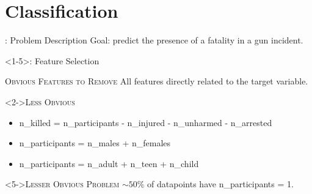 \section{Classification}

\begin{frame}[standout]{\currentname: Problem Description}
    Goal: predict the presence of a fatality in a gun incident.
\end{frame}

\begin{frame}<1-5>{\currentname: Feature Selection}
    \begin{exampleblock}{\textsc{Obvious Features to Remove}}
        All features directly related to the target variable.
    \end{exampleblock}
    \begin{exampleblock}<2->{\textsc{Less Obvious}}
        \begin{itemize}
            \item n\_killed = {n\_participants} - n\_injured - n\_unharmed - n\_arrested
            \item n\_participants = {n\_males} + n\_females
            \item n\_participants = {n\_adult} + n\_teen + n\_child
        \end{itemize}
    \end{exampleblock}
    \begin{exampleblock}<5->{\textsc{Lesser Obvious Problem}}
        $\sim50\%$ of datapoints have n\_participants = 1.
    \end{exampleblock}
\end{frame}

